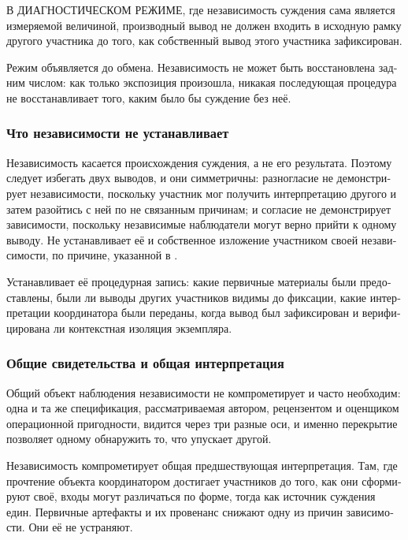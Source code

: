 \begin{russian}
В ДИАГНОСТИЧЕСКОМ РЕЖИМЕ, где независимость суждения сама является измеряемой величиной, производный вывод не должен входить в исходную рамку другого участника до того, как собственный вывод этого участника зафиксирован.

Режим объявляется до обмена. Независимость не может быть восстановлена задним числом: как только экспозиция произошла, никакая последующая процедура не восстанавливает того, каким было бы суждение без неё.


\subsubsection*{Что независимости не устанавливает}
\label{sec:ru:x--23}

Независимость касается происхождения суждения, а не его результата. Поэтому следует избегать двух выводов, и они симметричны: разногласие не демонстрирует независимости, поскольку участник мог получить интерпретацию другого и затем разойтись с ней по не связанным причинам; и согласие не демонстрирует зависимости, поскольку независимые наблюдатели могут верно прийти к одному выводу. Не устанавливает её и собственное изложение участником своей независимости, по причине, указанной в .

Устанавливает её процедурная запись: какие первичные материалы были предоставлены, были ли выводы других участников видимы до фиксации, какие интерпретации координатора были переданы, когда вывод был зафиксирован и верифицирована ли контекстная изоляция экземпляра.


\subsubsection*{Общие свидетельства и общая интерпретация}
\label{sec:ru:x--24}

Общий объект наблюдения независимости не компрометирует и часто необходим: одна и та же спецификация, рассматриваемая автором, рецензентом и оценщиком операционной пригодности, видится через три разные оси, и именно перекрытие позволяет одному обнаружить то, что упускает другой.

Независимость компрометирует общая предшествующая интерпретация. Там, где прочтение объекта координатором достигает участников до того, как они сформируют своё, входы могут различаться по форме, тогда как источник суждения един. Первичные артефакты и их провенанс снижают одну из причин зависимости. Они её не устраняют.



\end{russian}
